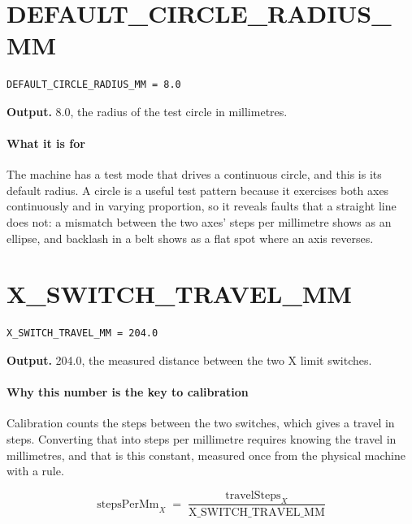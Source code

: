 \section{DEFAULT\_CIRCLE\_RADIUS\_MM}
\begin{lstlisting}[style=sig]
DEFAULT_CIRCLE_RADIUS_MM = 8.0
\end{lstlisting}

\noindent\textbf{Output.} 8.0, the radius of the test circle in millimetres.


\paragraph{What it is for}
The machine has a test mode that drives a continuous circle, and this is its default radius. A circle is a useful test pattern because it exercises both axes continuously and in varying proportion, so it reveals faults that a straight line does not: a mismatch between the two axes' steps per millimetre shows as an ellipse, and backlash in a belt shows as a flat spot where an axis reverses.


\section{X\_SWITCH\_TRAVEL\_MM}
\begin{lstlisting}[style=sig]
X_SWITCH_TRAVEL_MM = 204.0
\end{lstlisting}

\noindent\textbf{Output.} 204.0, the measured distance between the two X limit switches.


\paragraph{Why this number is the key to calibration}
Calibration counts the steps between the two switches, which gives a travel in steps. Converting that into steps per millimetre requires knowing the travel in millimetres, and that is this constant, measured once from the physical machine with a rule.


\begin{equation}
\mathrm{stepsPerMm}_X \;=\; \frac{\mathrm{travelSteps}_X}{\mathrm{X\_SWITCH\_TRAVEL\_MM}}
\end{equation}

